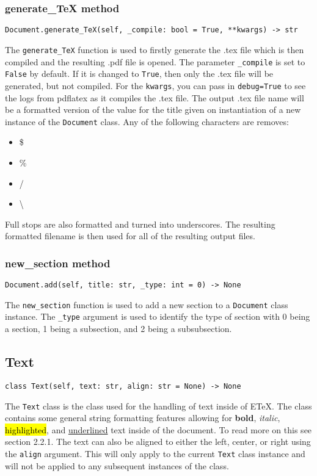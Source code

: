 \documentclass{article}
\begin{document}
\subsubsection[generate\_TeX method]{generate\_TeX method}
\lstset{language=python}
\begin{lstlisting}
Document.generate_TeX(self, _compile: bool = True, **kwargs) -> str
\end{lstlisting}
The \verb|generate_TeX| function is used to firstly generate the .tex file which is then compiled and the resulting .pdf file is opened. The parameter \verb|_compile| is set to \verb|False| by default. If it is changed to \verb|True|, then only the .tex file will be generated, but not compiled. For the \verb|kwargs|, you can pass in \verb|debug=True| to see the logs from pdflatex as it compiles the .tex file.
The output .tex file name will be a formatted version of the value for the title given on instantiation of a new instance of the \verb|Document| class. Any of the following characters are removes:\begin{itemize}
\item \$
\item \%
\item /
\item \textbackslash
\end{itemize}
Full stops are also formatted and turned into underscores. The resulting formatted filename is then used for all of the resulting output files.
\subsubsection[new\_section method]{new\_section method}
\lstset{language=python}
\begin{lstlisting}
Document.add(self, title: str, _type: int = 0) -> None
\end{lstlisting}
The \verb|new_section| function is used to add a new section to a \verb|Document| class instance. The \verb|_type| argument is used to identify the type of section with 0 being a section, 1 being a subsection, and 2 being a subsubsection.
\subsection[Text]{Text}
\lstset{language=python}
\begin{lstlisting}
class Text(self, text: str, align: str = None) -> None
\end{lstlisting}
The \verb|Text| class is the class used for the handling of text inside of ETeX. The class contains some general string formatting features allowing for \textbf{bold}, \textit{italic}, \hl{highlighted}, and \underline{underlined} text inside of the document. To read more on this see section 2.2.1. The text can also be aligned to either the left, center, or right using the \verb|align| argument. This will only apply to the current \verb|Text| class instance and will not be applied to any subsequent instances of the class.
\end{document}
